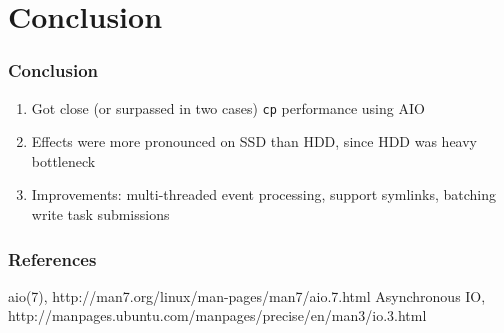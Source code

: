 \documentclass{beamer}
\begin{document}
\section{Conclusion}
\begin{frame}
\frametitle{Conclusion}
\begin{enumerate}[1.]
\item Got close (or surpassed in two cases) \texttt{cp} performance using AIO
\item Effects were more pronounced on SSD than HDD, since HDD was heavy bottleneck
\item Improvements: multi-threaded event processing, support symlinks, batching write task submissions
\end{enumerate}
\end{frame}

\begin{frame}
    \frametitle{References}
    \footnotesize{
        \begin{thebibliography}{99}
                aio(7), http://man7.org/linux/man-pages/man7/aio.7.html
            	Asynchronous IO, http://manpages.ubuntu.com/manpages/precise/en/man3/io.3.html
        \end{thebibliography}
        }
\end{frame}
\end{document}
